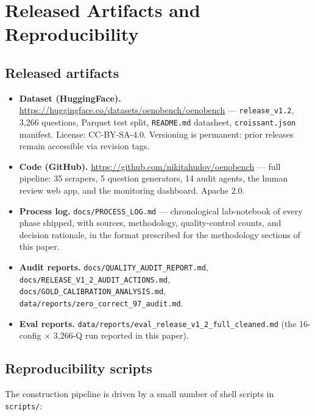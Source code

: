 \section{Released Artifacts and Reproducibility}
\label{app:artifacts}

\subsection{Released artifacts}

\begin{itemize}\itemsep -1pt
  \item \textbf{Dataset (HuggingFace).}
    \url{https://huggingface.co/datasets/oenobench/oenobench} —
    \texttt{release\_v1.2}, 3{,}266 questions, Parquet test split,
    \texttt{README.md} datasheet, \texttt{croissant.json} manifest.
    License: CC-BY-SA-4.0. Versioning is permanent: prior releases
    remain accessible via revision tags.
  \item \textbf{Code (GitHub).}
    \url{https://github.com/nikitahudov/oenobench} — full pipeline:
    35 scrapers, 5 question generators, 14 audit agents, the human
    review web app, and the monitoring dashboard. Apache 2.0.
  \item \textbf{Process log.} \texttt{docs/PROCESS\_LOG.md} —
    chronological lab-notebook of every phase shipped, with sources,
    methodology, quality-control counts, and decision rationale, in
    the format prescribed for the methodology sections of this paper.
  \item \textbf{Audit reports.} \texttt{docs/QUALITY\_AUDIT\_REPORT.md},
    \texttt{docs/RELEASE\_V1\_2\_AUDIT\_ACTIONS.md},
    \texttt{docs/GOLD\_CALIBRATION\_ANALYSIS.md},
    \texttt{data/reports/zero\_correct\_97\_audit.md}.
  \item \textbf{Eval reports.}
    \texttt{data/reports/eval\_release\_v1\_2\_full\_cleaned.md} (the
    16-config × 3{,}266-Q run reported in this paper).
\end{itemize}

\subsection{Reproducibility scripts}

The construction pipeline is driven by a small number of shell scripts
in \texttt{scripts/}:

